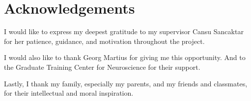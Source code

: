 \section{Acknowledgements}

I would like to express my deepest gratitude to my supervisor Cansu Sancaktar for her patience, guidance, and motivation throughout the project.\\\vspace{-12pt}

I would also like to thank Georg Martius for giving me this opportunity. And to the Graduate Training Center for Neuroscience for their support.\\\vspace{-12pt}

Lastly, I thank my family, especially my parents, and my friends and classmates, for their intellectual and moral inspiration.
